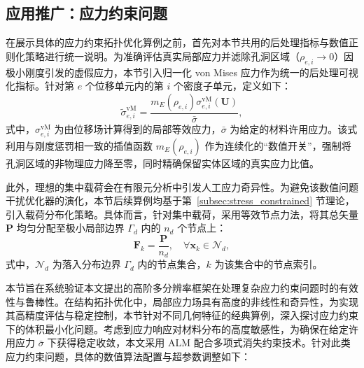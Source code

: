 \subsection{应用推广：应力约束问题}
\label{subsec:lfem_stress_constraint}

在展示具体的应力约束拓扑优化算例之前，首先对本节共用的后处理指标与数值正则化策略进行统一说明。为准确评估真实局部应力并滤除孔洞区域（$\rho_{e,i} \to 0$）因极小刚度引发的虚假应力，本节引入归一化 von Mises 应力作为统一的后处理可视化指标。针对第 $e$ 个位移单元内的第 $i$ 个密度子单元，定义如下：
\[
\tilde{\sigma}_{e,i}^{\text{vM}} = \frac{m_E(\rho_{e,i}) \sigma_{e,i}^{\text{vM}}(\boldsymbol{U})}{\bar{\sigma}},
\]
式中，$\sigma_{e,i}^{\text{vM}}$ 为由位移场计算得到的局部等效应力，$\bar{\sigma}$ 为给定的材料许用应力。该式利用与刚度惩罚相一致的插值函数 $m_E(\rho_{e,i})$ 作为连续化的“数值开关”，强制将孔洞区域的非物理应力降至零，同时精确保留实体区域的真实应力比值。

此外，理想的集中载荷会在有限元分析中引发人工应力奇异性。为避免该数值问题干扰优化器的演化，本节后续算例均基于第~\ref{subsec:stress_constrained} 节理论，引入载荷分布化策略。具体而言，针对集中载荷，采用等效节点力法，将其总矢量 $\boldsymbol{P}$ 均匀分配至极小局部边界 $\Gamma_d$ 内的 $n_d$ 个节点上：
\[
\boldsymbol{F}_k = \frac{\boldsymbol{P}}{n_d}, \quad \forall \boldsymbol{x}_k \in \mathcal{N}_d,
\]
式中，$\mathcal{N}_d$ 为落入分布边界 $\Gamma_d$ 内的节点集合，$k$ 为该集合中的节点索引。

本节旨在系统验证本文提出的高阶多分辨率框架在处理复杂应力约束问题时的有效性与鲁棒性。在结构拓扑优化中，局部应力场具有高度的非线性和奇异性，为实现其高精度评估与稳定控制，本节针对不同几何特征的经典算例，深入探讨应力约束下的体积最小化问题。考虑到应力响应对材料分布的高度敏感性，为确保在给定许用应力 $\bar{\sigma}$ 下获得稳定收敛，本文采用 ALM 配合多项式消失约束技术。针对此类应力约束问题，具体的数值算法配置与超参数调整如下：

